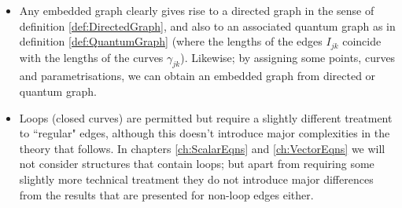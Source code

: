 \begin{itemize}
	\item Any embedded graph clearly gives rise to a directed graph in the sense of definition \ref{def:DirectedGraph}, and also to an associated quantum graph as in definition \ref{def:QuantumGraph} (where the lengths of the edges $I_{jk}$ coincide with the lengths of the curves $\gamma_{jk}$).
	Likewise; by assigning some points, curves and parametrisations, we can obtain an embedded graph from directed or quantum graph.
	\item Loops (closed curves) are permitted but require a slightly different treatment to ``regular" edges, although this doesn't introduce major complexities in the theory that follows.
	In chapters \ref{ch:ScalarEqns} and \ref{ch:VectorEqns} we will not consider structures that contain loops; but apart from requiring some slightly more technical treatment they do not introduce major differences from the results that are presented for non-loop edges either.
\end{itemize}

